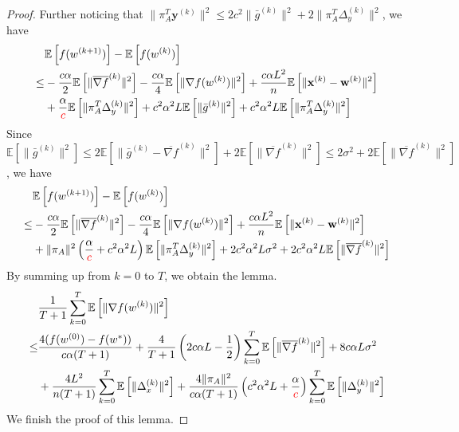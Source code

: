 \documentclass{article}
\newcommand{\vw}{{\mathbf{w}}}
\newcommand{\vx}{{\mathbf{x}}}
\newcommand{\vy}{{\mathbf{y}}}
\newcommand{\EE}[1]{\mathbb{E}\left[#1\right]}
\newcommand{\norm}[1]{\| #1 \|}
\begin{document}
\begin{proof}
Further noticing that $\norm{\pi_A^T\vy^{(k)}}^2\leq 2c^2\norm{\bar{g}^{(k)}}^2+2\norm{\pi_A^T\Delta_{y}^{(k)}}^2$, we have
  \begin{align*}
    &\EE{f(w^{(k+1)})}-\EE{f(w^{(k)})}\\ 
    \leq &-\frac{c\alpha}{2}\EE{\norm{\overline{\nabla f}^{(k)}}^2}-\frac{c\alpha}{4}\EE{\norm{\nabla f(w^{(k)})}^2}+\frac{c\alpha L^2}{n}\EE{\norm{\vx^{(k)}-\vw^{(k)}}^2}\\&+\frac{\alpha}{\textcolor{red}{c}}\EE{\norm{\pi_{A}^T\Delta_{y}^{(k)}}^2}+c^2\alpha^2L\EE{\norm{\bar{g}^{(k)}}^2}+c^2\alpha^2L\EE{\norm{\pi_A^T\Delta_{y}^{(k)}}^2}
  \end{align*}
  Since $\EE{\norm{\bar{g}^{(k)}}^2}\leq 2\EE{\norm{\bar{g}^{(k)}-\overline{\nabla f}^{(k)}}^2}+2\EE{\norm{\overline{\nabla f}^{(k)}}^2}\leq 2\sigma^2+2\EE{\norm{\overline{\nabla f}^{(k)}}^2}$, we have
\begin{align*}
  &\EE{f(w^{(k+1)})}-\EE{f(w^{(k)})}\\ 
    \leq &-\frac{c\alpha}{2}\EE{\norm{\overline{\nabla f}^{(k)}}^2}-\frac{c\alpha}{4}\EE{\norm{\nabla f(w^{(k)})}^2}+\frac{c\alpha L^2}{n}\EE{\norm{\vx^{(k)}-\vw^{(k)}}^2}\\&+\norm{\pi_A}^2\left(\frac{\alpha}{\textcolor{red}{c}}+c^2\alpha^2L\right)\EE{\norm{\pi_{A}^T\Delta_{y}^{(k)}}^2}+2c^2\alpha^2L\sigma^2+2c^2\alpha^2L\EE{\norm{\overline{\nabla f}^{(k)}}^2}
\end{align*}
By summing up from $k=0$ to $T$, we obtain the lemma.
\begin{align*}
  &\frac{1}{T+1}\sum_{k=0}^T\EE{\norm{\nabla f(w^{(k)})}^2}\\ 
  \leq & \frac{4(f(w^{(0)})-f(w^{*}))}{c\alpha(T+1)}+\frac{4}{T+1}\left(2c\alpha L-\frac{1}{2}\right)\sum_{k=0}^T\EE{\norm{\overline{\nabla f}^{(k)}}^2}+8c\alpha L\sigma^2\\&+\frac{ 4L^2}{n(T+1)}\sum_{k=0}^T\EE{\norm{\Delta_x^{(k)}}^2}+\frac{4\norm{\pi_A}^2}{c\alpha(T+1)}\left(c^2\alpha^2L+\frac{\alpha}{\textcolor{red}{c}}\right)\sum_{k=0}^T\EE{\norm{\Delta_{y}^{(k)}}^2}
\end{align*}
We finish the proof of this lemma.
\end{proof}
\end{document}
